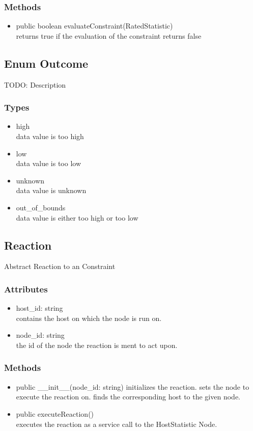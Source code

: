 \subsubsection{Methods}
\begin{itemize}
	\item public boolean evaluateConstraint(RatedStatistic)\\
	returns true if the evaluation of the constraint returns false
\end{itemize}

\subsection{Enum Outcome }
TODO: Description

\subsubsection{Types}
\begin{itemize}
	\item high\\
	data value is too high
	\item low\\
	data value is too low
	\item unknown\\
	data value is unknown
	\item out\_of\_bounds\\
	data value is either too high or too low
\end{itemize}


\subsection{Reaction}
	Abstract Reaction to an Constraint
\subsubsection{Attributes}
\begin{itemize}
	\item host\_id: string \\
		contains the host on which the node is run on.
	\item node\_id: string \\
		the id of the node the reaction is ment to act upon. 
\end{itemize}
\subsubsection{Methods}
\begin{itemize}
	\item public \_\_init\_\_(node\_id: string)
		initializes the reaction. sets the node to execute the reaction on. finds the corresponding host to the given node.
	\item public executeReaction()\\
		executes the reaction as a service call to the HostStatistic Node.
\end{itemize}


